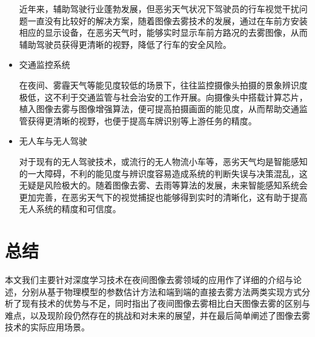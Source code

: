 \begin{multicols}{2}
\begin{itemize}
	近年来，辅助驾驶行业蓬勃发展，但恶劣天气状况下驾驶员的行车视觉干扰问题一直没有比较好的解决方案，随着图像去雾技术的发展，通过在车前方安装相应的显示设备，在恶劣天气时，能够实时显示车前方路况的去雾图像，从而辅助驾驶员获得更清晰的视野，降低了行车的安全风险。
	
	\item 交通监控系统
	
	在夜间、雾霾天气等能见度较低的场景下，往往监控摄像头拍摄的景象辨识度极低，这不利于交通监管与社会治安的工作开展。向摄像头中搭载计算芯片，植入图像去雾与图像增强算法，便可提高拍摄画面的能见度，从而帮助交通监管获得更清晰的视野，也便于提高车牌识别等上游任务的精度。
	
	\item 无人车与无人驾驶
	
	对于现有的无人驾驶技术，或流行的无人物流小车等，恶劣天气均是智能感知的一大障碍，不利的能见度与辨识度容易造成系统的判断失误与决策混乱，这无疑是风险极大的。随着图像去雾、去雨等算法的发展，未来智能感知系统会更加完善，在恶劣天气下的视觉捕捉也能够得到实时的清晰化，这有助于提高无人系统的精度和可信度。
	
\end{itemize}
\section{总结}
本文我们主要针对深度学习技术在夜间图像去雾领域的应用作了详细的介绍与论述，分别从基于物理模型的参数估计方法和端到端的直接去雾方法两类实现方式分析了现有技术的优势与不足，同时指出了夜间图像去雾相比白天图像去雾的区别与难点，以及现阶段仍然存在的挑战和对未来的展望，并在最后简单阐述了图像去雾技术的实际应用场景。

\end{multicols}




















